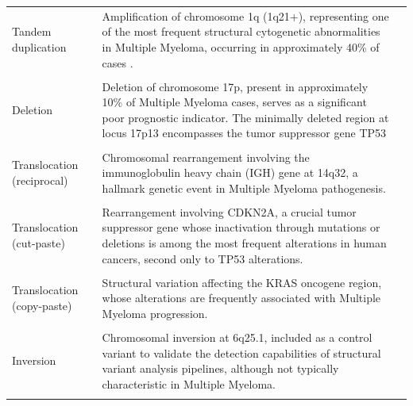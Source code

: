 \begin{longtable}{>{\RaggedRight\arraybackslash}p{2.5cm} 
                  >{\RaggedRight\arraybackslash}p{10.5cm} 
                  >{\RaggedLeft\arraybackslash}p{1.75cm}}
    \\
    Tandem \mbox{duplication}         & Amplification of chromosome 1q (1q21+), representing one of the most frequent structural cytogenetic abnormalities in Multiple Myeloma, occurring in approximately 40\% of cases .     & 10152930 \\
    \\
    Deletion                          & Deletion of chromosome 17p, present in approximately 10\% of Multiple Myeloma cases, serves as a significant poor prognostic indicator. The minimally deleted region at locus 17p13 encompasses the tumor suppressor gene TP53 & 234564 \\
    \\
    Translocation \mbox{(reciprocal)} & Chromosomal rearrangement involving the immunoglobulin heavy chain (IGH) gene at 14q32, a hallmark genetic event in Multiple Myeloma pathogenesis.                                                  & 1502367  \\
    \\
    Translocation \mbox{(cut-paste)}  & Rearrangement involving CDKN2A, a crucial tumor suppressor gene whose inactivation through mutations or deletions is among the most frequent alterations in human cancers, second only to TP53 alterations. & 31271 \\
    \\
    Translocation \mbox{(copy-paste)} & Structural variation affecting the KRAS oncogene region, whose alterations are frequently associated with Multiple Myeloma progression.  & 45683 \\
    \\
    Inversion                         & Chromosomal inversion at 6q25.1, included as a control variant to validate the detection capabilities of structural variant analysis pipelines, although not typically characteristic in Multiple Myeloma.          & 3600001  \\
    \\

\end{longtable}
\endgroup



